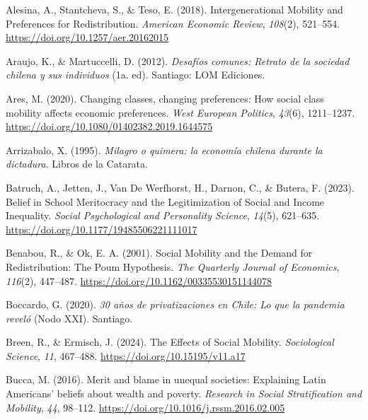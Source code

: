 \documentclass[
  12pt,
]{article}
\newlength{\cslhangindent}
\newenvironment{CSLReferences}[2] %
 {\begin{list}{}{%
  \setlength{\itemindent}{0pt}
  \setlength{\leftmargin}{0pt}
  \setlength{\parsep}{0pt}
  \ifodd #1
   \setlength{\leftmargin}{\cslhangindent}
   \setlength{\itemindent}{-1\cslhangindent}
  \fi
  \setlength{\itemsep}{#2\baselineskip}}}
 {\end{list}}
\begin{document}
\label{refs}
\begin{CSLReferences}{1}{0}
Alesina, A., Stantcheva, S., \& Teso, E. (2018). Intergenerational
{Mobility} and {Preferences} for {Redistribution}. \emph{American
Economic Review}, \emph{108}(2), 521--554.
\url{https://doi.org/10.1257/aer.20162015}

Araujo, K., \& Martuccelli, D. (2012). \emph{Desaf{í}os comunes: Retrato
de la sociedad chilena y sus individuos} (1a. ed). Santiago: LOM
Ediciones.

Ares, M. (2020). Changing classes, changing preferences: How social
class mobility affects economic preferences. \emph{West European
Politics}, \emph{43}(6), 1211--1237.
\url{https://doi.org/10.1080/01402382.2019.1644575}

Arrizabalo, X. (1995). \emph{{Milagro o quimera: la econom{í}a chilena
durante la dictadura}}. Libros de la Catarata.

Batruch, A., Jetten, J., Van De Werfhorst, H., Darnon, C., \& Butera, F.
(2023). Belief in {School Meritocracy} and the {Legitimization} of
{Social} and {Income Inequality}. \emph{Social Psychological and
Personality Science}, \emph{14}(5), 621--635.
\url{https://doi.org/10.1177/19485506221111017}

Benabou, R., \& Ok, E. A. (2001). Social {Mobility} and the {Demand} for
{Redistribution}: {The Poum Hypothesis}. \emph{The Quarterly Journal of
Economics}, \emph{116}(2), 447--487.
\url{https://doi.org/10.1162/00335530151144078}

Boccardo, G. (2020). \emph{30 a{ñ}os de privatizaciones en {Chile}: Lo
que la pandemia revel{ó}} (Nodo XXI). Santiago.

Breen, R., \& Ermisch, J. (2024). The {Effects} of {Social Mobility}.
\emph{Sociological Science}, \emph{11}, 467--488.
\url{https://doi.org/10.15195/v11.a17}

Bucca, M. (2016). Merit and blame in unequal societies: {Explaining
Latin Americans}' beliefs about wealth and poverty. \emph{Research in
Social Stratification and Mobility}, \emph{44}, 98--112.
\url{https://doi.org/10.1016/j.rssm.2016.02.005}


\end{CSLReferences}
\end{document}
